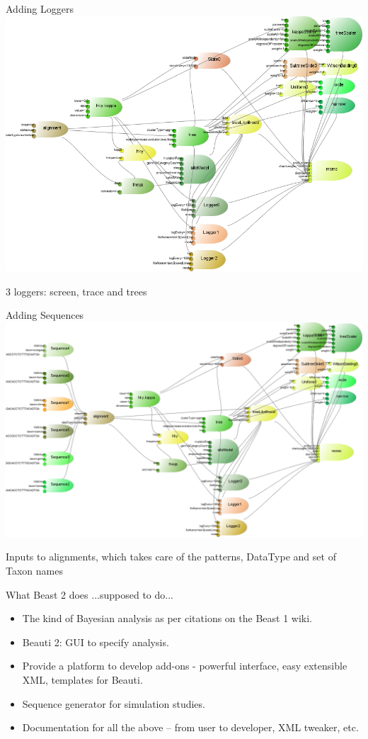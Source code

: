 \documentclass{beamer}
\theoremstyle{definition}
\begin{document}
\begin{frame}{Adding Loggers}
\includegraphics[width=\textwidth]{example5.png}

3 loggers: screen, trace and trees
\end{frame}
\begin{frame}{Adding Sequences}
\includegraphics[width=\textwidth]{example6.png}

Inputs to alignments, which takes care of the patterns, DataType and set of Taxon names
\end{frame}


\begin{frame}{What Beast 2 does}
...supposed to do...

\begin{itemize}
\item The kind of Bayesian analysis as per citations on the Beast 1 wiki.
\item Beauti 2: GUI to specify analysis.
\item Provide a platform to develop add-ons - powerful interface, easy extensible XML, templates for Beauti.
\item Sequence generator for simulation studies.
\item Documentation for all the above -- from user to developer, XML tweaker, etc.
\end{itemize}

\end{frame}
\end{document}
